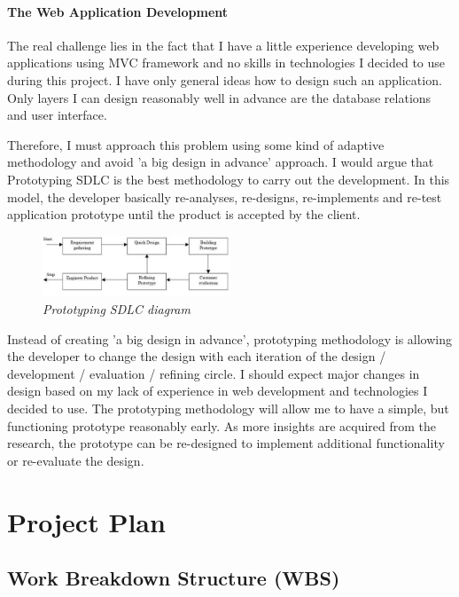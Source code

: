 \documentclass[12pt,twoside,a4paper]{report}
\begin{document}
\paragraph{The Web Application Development\\}
The real challenge lies in the fact that I have a little experience developing web applications using MVC framework and no skills in technologies I decided to use during this project. I have only general ideas how to design such an application. Only layers I can design reasonably well in advance are the database relations and user interface.\par
Therefore, I must approach this problem using some kind of adaptive methodology and avoid 'a big design in advance' approach. I would argue that Prototyping SDLC is the best methodology to carry out the development. In this model, the developer basically re-analyses, re-designs, re-implements and re-test application prototype until the product is accepted by the client.

\begin{figure}[!ht]
	\centering
		\includegraphics[width=0.5\textwidth, totalheight=3cm]{prototyping}
	\caption{\textit{Prototyping SDLC diagram}}
\end{figure}

Instead of creating 'a big design in advance', prototyping methodology is allowing the developer to change the design with each iteration of the design / development / evaluation / refining circle. I should expect major changes in design based on my lack of experience in web development and technologies I decided to use. The prototyping methodology will allow me to have a simple, but functioning prototype reasonably early. As more insights are acquired from the research, the prototype can be re-designed to implement additional functionality or re-evaluate the design.

\section{Project Plan}
\subsection{Work Breakdown Structure (WBS)}
\end{document}
